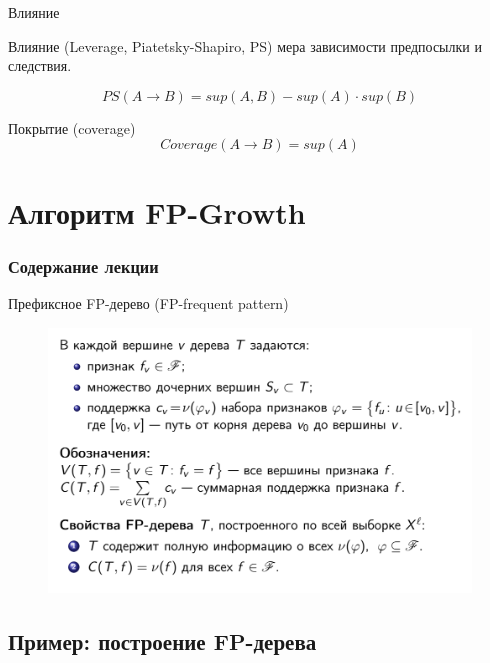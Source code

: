\documentclass{beamer}
\begin{document}
\begin{frame}{Влияние}
	\begin{block}{Влияние (Leverage, Piatetsky-Shapiro, PS)}
		мера зависимости предпосылки и следствия.
		
		\[PS(A \rightarrow B)=sup(A,B)-sup(A)\cdot sup(B)\]		
	\end{block}

	\begin{block}{Покрытие (coverage)}			
		\[Coverage(A \rightarrow B)=sup(A)\]		
	\end{block}	
\end{frame}

\section{Алгоритм FP-Growth}

\begin{frame}
  \frametitle{Содержание лекции}
  \tableofcontents[current]
\end{frame}

\begin{frame}{Префиксное FP-дерево (FP-frequent pattern)}
	\begin{figure}[h]
		\centering
		\includegraphics[scale=0.45]{images/lec08-pic31.png}
	\end{figure}
\end{frame}

\subsection{Пример: построение FP-дерева}
\end{document}
